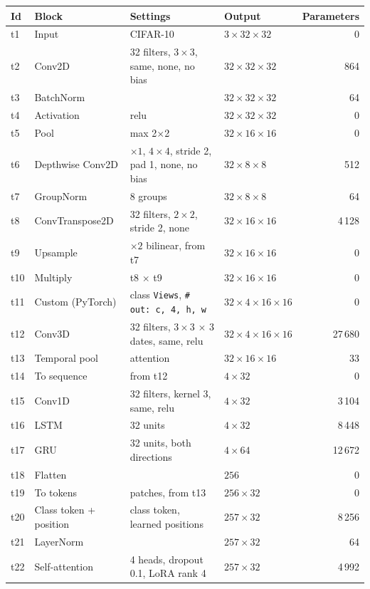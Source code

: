 {\small
\begin{longtable}{@{}lp{3.2cm}p{5.4cm}lr@{}}
\toprule
\textbf{Id} & \textbf{Block} & \textbf{Settings} & \textbf{Output} & \textbf{Parameters}\\
\midrule\endhead
t1 & Input & CIFAR-10 & $3\times32\times32$ & 0\\
t2 & Conv2D & 32 filters, $3\times3$, same, none, no bias & $32\times32\times32$ & 864\\
t3 & BatchNorm &  & $32\times32\times32$ & 64\\
t4 & Activation & relu & $32\times32\times32$ & 0\\
t5 & Pool & max 2$\times$2 & $32\times16\times16$ & 0\\
t6 & Depthwise Conv2D & $\times1$, $4\times4$, stride 2, pad 1, none, no bias & $32\times8\times8$ & 512\\
t7 & GroupNorm & 8 groups & $32\times8\times8$ & 64\\
t8 & ConvTranspose2D & 32 filters, $2\times2$, stride 2, none & $32\times16\times16$ & 4\,128\\
t9 & Upsample & $\times2$ bilinear, from t7 & $32\times16\times16$ & 0\\
t10 & Multiply & t8 $\times$ t9 & $32\times16\times16$ & 0\\
t11 & Custom (PyTorch) & class \texttt{Views}, \texttt{\# out: c, 4, h, w} & $32\times4\times16\times16$ & 0\\
t12 & Conv3D & 32 filters, $3\times3$ $\times$ 3 dates, same, relu & $32\times4\times16\times16$ & 27\,680\\
t13 & Temporal pool & attention & $32\times16\times16$ & 33\\
t14 & To sequence & from t12 & $4\times32$ & 0\\
t15 & Conv1D & 32 filters, kernel 3, same, relu & $4\times32$ & 3\,104\\
t16 & LSTM & 32 units & $4\times32$ & 8\,448\\
t17 & GRU & 32 units, both directions & $4\times64$ & 12\,672\\
t18 & Flatten &  & $256$ & 0\\
t19 & To tokens & patches, from t13 & $256\times32$ & 0\\
t20 & Class token + position & class token, learned positions & $257\times32$ & 8\,256\\
t21 & LayerNorm &  & $257\times32$ & 64\\
t22 & Self-attention & 4 heads, dropout 0.1, LoRA rank 4 & $257\times32$ & 4\,992\\

\end{longtable}}
